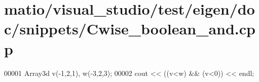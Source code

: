 \hypertarget{matio_2visual__studio_2test_2eigen_2doc_2snippets_2_cwise__boolean__and_8cpp_source}{}\section{matio/visual\+\_\+studio/test/eigen/doc/snippets/\+Cwise\+\_\+boolean\+\_\+and.cpp}
\label{matio_2visual__studio_2test_2eigen_2doc_2snippets_2_cwise__boolean__and_8cpp_source}

\begin{DoxyCode}
00001 Array3d v(-1,2,1), w(-3,2,3);
00002 cout << ((v<w) && (v<0)) << endl;
\end{DoxyCode}
